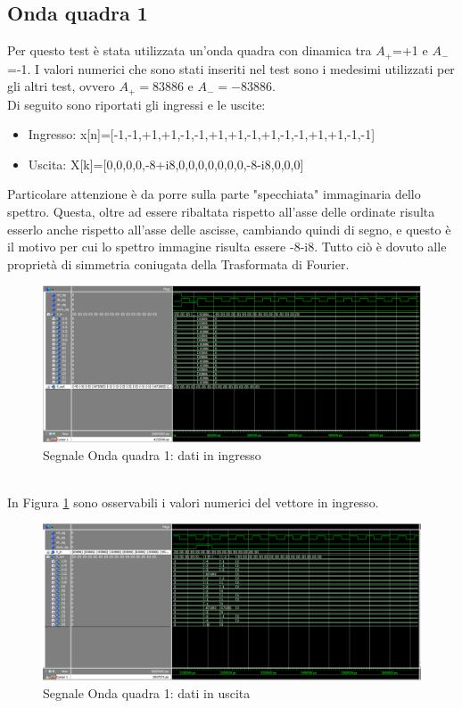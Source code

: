 \documentclass[a4paper, titlepage]{article}
\begin{document}
\subsection{Onda quadra 1}
Per questo test è stata utilizzata un'onda quadra con dinamica tra $A_+$=+1 e $A_-$=-1. I valori numerici che sono stati inseriti nel test sono i medesimi utilizzati per gli altri test, ovvero $A_+=83886$ e $A_-=-83886$.\\Di seguito sono riportati gli ingressi e le uscite:
\begin{itemize}
    \item Ingresso: x[n]=[-1,-1,+1,+1,-1,-1,+1,+1,-1,+1,-1,-1,+1,+1,-1,-1]
    \item Uscita:   X[k]=[0,0,0,0,-8+i8,0,0,0,0,0,0,0,-8-i8,0,0,0]
\end{itemize}
Particolare attenzione è da porre sulla parte "specchiata" immaginaria dello spettro. Questa, oltre ad essere ribaltata rispetto all'asse delle ordinate risulta esserlo anche rispetto all'asse delle ascisse, cambiando quindi di segno, e questo è il motivo per cui lo spettro immagine risulta essere -8-i8. Tutto ciò è dovuto alle proprietà di simmetria coniugata della Trasformata di Fourier.
\begin{figure}[h]
    \centering
    \includegraphics[scale=0.45]{test_square1/fs_square_in.png}
    \caption{Segnale Onda quadra 1: dati in ingresso}
    \label{fig:square_in}
\end{figure}\\
In Figura \ref{fig:square_in} sono osservabili i valori numerici del vettore in ingresso.
\pagebreak
\begin{figure}[h]
    \centering
    \includegraphics[scale=0.45]{test_square1/fs_square_out.png}
    \caption{Segnale Onda quadra 1: dati in uscita}
    \label{fig:square_out}
\end{figure}
\end{document}
